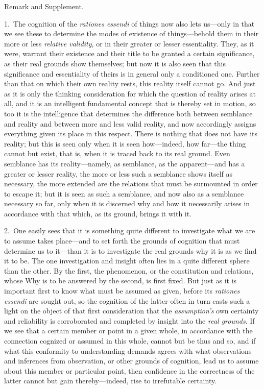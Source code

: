 \documentclass[12pt,a4paper]{book}
\begin{document}
\begin{center}Remark and Supplement.\end{center}
1.~The cognition of the \textit{rationes essendi} of things now also lets us---only
in that we see these to determine the modes of existence of things---behold them
in their more or less \emph{relative validity}, or in their greater or lesser
essentiality. They, as it were, warrant their existence and their title to be
granted a certain significance, as their real grounds show themselves; but now it
is also seen that this significance and essentiality of theirs is in general only
a conditioned one. Further than that on which their own reality rests, this
reality itself cannot go. And just as it is only the thinking consideration for
which the question of reality arises at all, and it is an intelligent fundamental
concept that is thereby set in motion, so too it is the intelligence that
determines the difference both between semblance and reality and between more and
less valid reality, and now accordingly assigns everything given its place in
this respect. There is nothing that does not have its reality; but this is seen
only when it is seen how---indeed, how far---the thing cannot but exist, that is,
when it is traced back to its real ground. Even semblance has its reality---namely,
as semblance, as the apparent---and has a greater or lesser reality, the more or
less such a semblance shows itself as necessary, the more extended are the
relations that must be surmounted in order to escape it; but it is seen as such a
semblance, and now also as a semblance necessary so far, only when it is discerned
why and how it necessarily arises in accordance with that which, as its ground,
brings it with it.

2.~One easily sees that it is something quite different to investigate what we are
to assume takes place---and to set forth the grounds of cognition that must
determine us to it---than it is to investigate the real grounds why it is as we
find it to be. The one investigation and insight often lies in a quite different
sphere than the other. By the first, the phenomenon, or the constitution and
relations, whose Why is to be answered by the second, is first fixed. But just as
it is important first to know what must be assumed as given, before its
\textit{rationes essendi} are sought out, so the cognition of the latter often in
turn casts such a light on the object of that first consideration that the
\emph{assumption's} own certainty and reliability is corroborated and completed by
insight into the \emph{real grounds}. If we see that a certain member or point in
a given whole, in accordance with the connection cognized or assumed in this
whole, cannot but be thus and so, and if what this conformity to understanding
demands agrees with what observations and inferences from observation, or other
grounds of cognition, lead us to assume about this member or particular point,
then confidence in the correctness of the latter cannot but gain thereby---indeed,
rise to irrefutable certainty.
\end{document}
